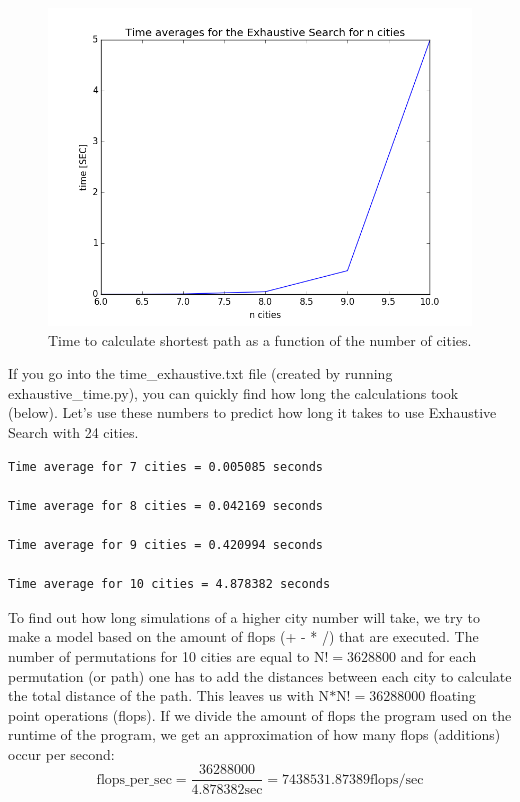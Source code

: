 \documentclass[10pt, a4paper]{article}
\begin{document}
\begin{figure}[h!]\centering
\includegraphics[width = \linewidth]{time_exhaust.png} 
\caption{Time to calculate shortest path as a function of the number of cities.}
\label{fig:time_exhaust}
\end{figure}

If you go into the time\_exhaustive.txt file (created by running exhaustive\_time.py), you can quickly find how long the calculations took (below). Let's use these numbers to predict how long it takes to use Exhaustive Search with 24 cities.
\begin{lstlisting}
Time average for 7 cities = 0.005085 seconds 

Time average for 8 cities = 0.042169 seconds 

Time average for 9 cities = 0.420994 seconds 

Time average for 10 cities = 4.878382 seconds 
\end{lstlisting}
To find out how long simulations of a higher city number will take, we try to make a model based on the amount of flops (+ - * /) that are executed.
The number of permutations for 10 cities are equal to N!$ = 3628800$ and for each permutation (or path) one has to add the distances between each city to calculate the total distance of the path. 
This leaves us with N$*$N!$ = 36288000$ floating point operations (flops). If we divide the amount of flops the program used on the runtime of the program, we get an approximation of how many flops (additions) occur per second:
$$\text{flops\_per\_sec} = \frac{36288000}{4.878382 \text{sec}} = 7438531.87389 \text{flops/sec}$$
\end{document}
